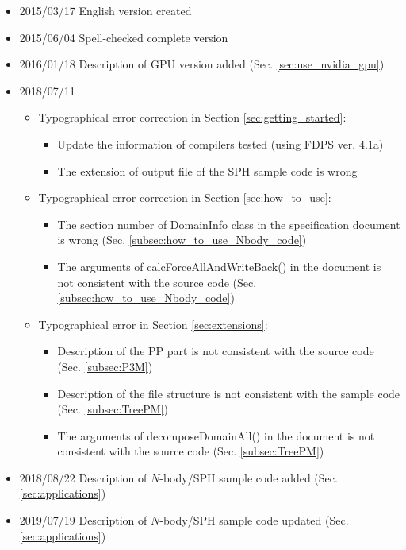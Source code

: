 \begin{itemize}
\item 2015/03/17 English version created
\item 2015/06/04 Spell-checked complete version
\item 2016/01/18 Description of GPU version added (Sec. \ref{sec:use_nvidia_gpu})
\item 2018/07/11
  \begin{itemize}
  \item Typographical error correction in Section \ref{sec:getting_started}:
    \begin{itemize}
    \item Update the information of compilers tested (using FDPS ver. 4.1a)
    \item The extension of output file of the SPH sample code is wrong
    \end{itemize}
  \item Typographical error correction in Section \ref{sec:how_to_use}:
    \begin{itemize}
    \item The section number of DomainInfo class in the specification document is wrong (Sec. \ref{subsec:how_to_use_Nbody_code})
    \item The arguments of calcForceAllAndWriteBack() in the document is not consistent with the source code (Sec. \ref{subsec:how_to_use_Nbody_code})
    \end{itemize}
  \item Typographical error in Section \ref{sec:extensions}:
    \begin{itemize}
    \item Description of the PP part is not consistent with the source code (Sec. \ref{subsec:P3M})
    \item Description of the file structure is not consistent with the sample code (Sec. \ref{subsec:TreePM})
    \item The arguments of decomposeDomainAll() in the document is not consistent with the source code (Sec. \ref{subsec:TreePM})
    \end{itemize}
  \end{itemize}

\item 2018/08/22 Description of $N$-body/SPH sample code added (Sec. \ref{sec:applications})

\item 2019/07/19 Description of $N$-body/SPH sample code updated (Sec. \ref{sec:applications})


\end{itemize}
